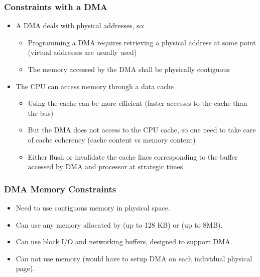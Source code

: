 \begin{frame}
  \frametitle{Constraints with a DMA}
  \begin{itemize}
  \item A DMA deals with physical addresses, so:
    \begin{itemize}
    \item Programming a DMA requires retrieving a physical address at
      some point (virtual addresses are usually used)
    \item The memory accessed by the DMA shall be physically
      contiguous
    \end{itemize}
  \item The CPU can access memory through a data cache
    \begin{itemize}
    \item Using the cache can be more efficient (faster accesses to
      the cache than the bus)
    \item But the DMA does not access to the CPU cache, so one need to
      take care of cache coherency (cache content vs memory content)
    \item Either flush or invalidate the cache lines corresponding to
      the buffer accessed by DMA and processor at strategic times
    \end{itemize}
  \end{itemize}
\end{frame}

\begin{frame}
  \frametitle{DMA Memory Constraints}
  \begin{itemize}
  \item Need to use contiguous memory in physical space.
  \item Can use any memory allocated by  (up to 128 KB)
    or  (up to 8MB).
  \item Can use block I/O and networking buffers, designed to support
    DMA.
  \item Can not use  memory (would have to setup DMA on each
    individual physical page).
  \end{itemize}
\end{frame}

